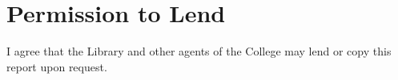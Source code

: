\chapter*{Permission to Lend}

I agree that the Library and other agents of the College may lend or copy
this report upon request.

$ $\\
$ $\\
\signedanddate
